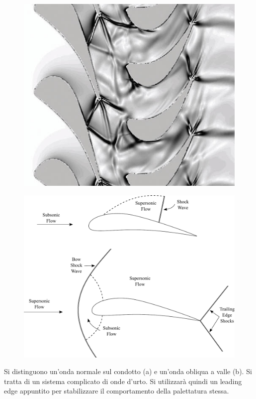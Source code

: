 \begin{figure}
\centering
\begin{minipage}{.5\textwidth}
  \centering
  \includegraphics[width=.95\linewidth]{fig/ou_schiera.png}
  \label{fig:ou_schiera}
\end{minipage}%
\begin{minipage}{.5\textwidth}
  \centering
  \includegraphics[width=.95\linewidth]{fig/SupSonic.pdf}
  \label{fig:SupSonic}
\end{minipage}
\end{figure}
Si distinguono un'onda normale sul condotto (a) e un'onda obliqua a valle (b). Si tratta di un sistema complicato di onde d'urto. Si utilizzarà quindi un leading edge appuntito per stabilizzare il comportamento della palettatura stessa.

